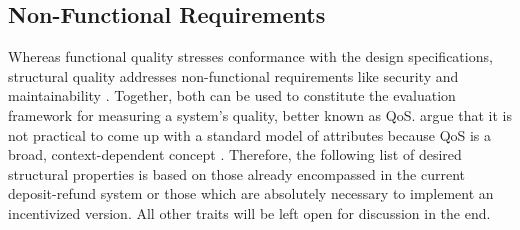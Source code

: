\subsection{Non-Functional Requirements}
Whereas functional quality stresses conformance with the design specifications, structural quality addresses non-functional requirements like security and maintainability \cite[p.~2]{Martinez-Ortiz:2016:QMW:3011141.3011203}. Together, both can be used to constitute the evaluation framework for measuring a system's quality, better known as \ac{QoS}. \citeauthor{Liu:2004:QCP:1013367.1013379} argue that it is not practical to come up with a standard model of attributes because \ac{QoS} is a broad, context-dependent concept \cite[p.~67]{Liu:2004:QCP:1013367.1013379}. Therefore, the following list of desired structural properties is based on those already encompassed in the current deposit-refund system or those which are absolutely necessary to implement an incentivized version. All other traits will be left open for discussion in the end.

